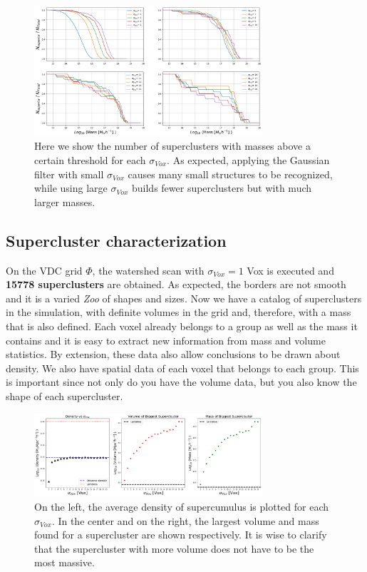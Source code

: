 \documentclass[a4paper,fleqn,usenatbib]{mnras}
\begin{document}
\begin{figure}
    \centering
    \includegraphics[width=240pt]{MasasMayoresnormc.png}
    \caption{Here we show the number of superclusters with masses above a certain threshold for each $\sigma_{Vox}$. As expected, applying the Gaussian filter with small $\sigma_{Vox}$ causes many small structures to be recognized, while using large $\sigma_{Vox}$ builds fewer superclusters but with much larger masses.}
    \label{fig:masaAcumulada}
\end{figure}

\subsection{Supercluster characterization}

On the VDC grid $\Phi$, the watershed scan with $\sigma_{Vox} = 1$ Vox is executed and \textbf{15778 superclusters} are obtained. As expected, the borders are not smooth and it is a varied \emph{Zoo} of shapes and sizes. Now we have a catalog of superclusters in the simulation, with definite volumes in the grid and, therefore, with a mass that is also defined. Each voxel already belongs to a group as well as the mass it contains and it is easy to extract new information from mass and volume statistics. By extension, these data also allow conclusions to be drawn about density. We also have spatial data of each voxel that belongs to each group. This is important since not only do you have the volume data, but you also know the shape of each supercluster. 

\begin{figure}
    \centering
    \includegraphics[width=240pt]{DensidadSigma.png}
    \caption{On the left, the average density of supercumulus is plotted for each $\sigma_{Vox}$. In the center and on the right, the largest volume and mass found for a supercluster are shown respectively. It is wise to clarify that the supercluster with more volume does not have to be the most massive.}
    \label{fig:DensMassVolLani}
\end{figure}
\end{document}
